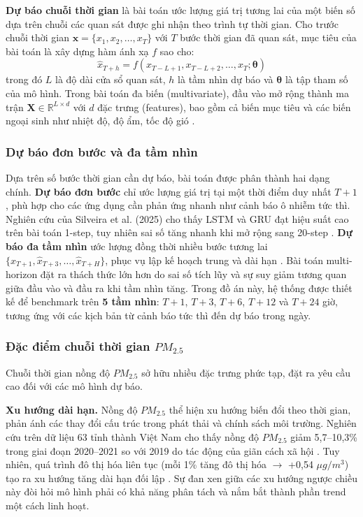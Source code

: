 \textbf{Dự báo chuỗi thời gian} là bài toán ước lượng giá trị tương lai của một biến số dựa trên chuỗi các quan sát được ghi nhận theo trình tự thời gian. Cho trước chuỗi thời gian $\mathbf{x} = \{x_1, x_2, \ldots, x_T\}$ với $T$ bước thời gian đã quan sát, mục tiêu của bài toán là xây dựng hàm ánh xạ $f$ sao cho:
\begin{equation}
    \hat{x}_{T+h} = f(x_{T-L+1}, x_{T-L+2}, \ldots, x_T; \boldsymbol{\theta})
\end{equation}
trong đó $L$ là độ dài cửa sổ quan sát, $h$ là tầm nhìn dự báo và $\boldsymbol{\theta}$ là tập tham số của mô hình. Trong bài toán đa biến (multivariate), đầu vào mở rộng thành ma trận $\mathbf{X} \in \mathbb{R}^{L \times d}$ với $d$ đặc trưng (features), bao gồm cả biến mục tiêu và các biến ngoại sinh như nhiệt độ, độ ẩm, tốc độ gió \cite{Chen_2026, liu2024itransformer}.

\subsubsection{Dự báo đơn bước và đa tầm nhìn}

Dựa trên số bước thời gian cần dự báo, bài toán được phân thành hai dạng chính. \textbf{Dự báo đơn bước} chỉ ước lượng giá trị tại một thời điểm duy nhất $T+1$, phù hợp cho các ứng dụng cần phản ứng nhanh như cảnh báo ô nhiễm tức thì. Nghiên cứu của Silveira et al. (2025) cho thấy LSTM và GRU đạt hiệu suất cao trên bài toán 1-step, tuy nhiên sai số tăng nhanh khi mở rộng sang 20-step \cite{silveira2025lstmgru}. \textbf{Dự báo đa tầm nhìn} ước lượng đồng thời nhiều bước tương lai $\{\hat{x}_{T+1}, \hat{x}_{T+3}, \ldots, \hat{x}_{T+H}\}$, phục vụ lập kế hoạch trung và dài hạn \cite{armstrong1992mape}. Bài toán multi-horizon đặt ra thách thức lớn hơn do sai số tích lũy và sự suy giảm tương quan giữa đầu vào và đầu ra khi tầm nhìn tăng. Trong đồ án này, hệ thống được thiết kế để benchmark trên \textbf{5 tầm nhìn}: $T+1$, $T+3$, $T+6$, $T+12$ và $T+24$ giờ, tương ứng với các kịch bản từ cảnh báo tức thì đến dự báo trong ngày.

\subsubsection{Đặc điểm chuỗi thời gian $PM_{2.5}$}

Chuỗi thời gian nồng độ $PM_{2.5}$ sở hữu nhiều đặc trưng phức tạp, đặt ra yêu cầu cao đối với các mô hình dự báo.

\textbf{Xu hướng dài hạn.} Nồng độ $PM_{2.5}$ thể hiện xu hướng biến đổi theo thời gian, phản ánh các thay đổi cấu trúc trong phát thải và chính sách môi trường. Nghiên cứu trên dữ liệu 63 tỉnh thành Việt Nam cho thấy nồng độ $PM_{2.5}$ giảm 5,7--10,3\% trong giai đoạn 2020--2021 so với 2019 do tác động của giãn cách xã hội \cite{hoang2023health}. Tuy nhiên, quá trình đô thị hóa liên tục (mỗi 1\% tăng đô thị hóa $\rightarrow$ +0,54 $\mu g/m^3$) tạo ra xu hướng tăng dài hạn đối lập \cite{bui2025urbanization}. Sự đan xen giữa các xu hướng ngược chiều này đòi hỏi mô hình phải có khả năng phân tách và nắm bắt thành phần trend một cách linh hoạt.

